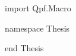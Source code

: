 \documentclass[titlepage]{report}
\begin{document}



\begin{leanhidden}
    import Qpf.Macro

    namespace Thesis
\end{leanhidden}


%
%

\thesistext{}



\begin{leanhidden}
    end Thesis
\end{leanhidden}





\end{document}
